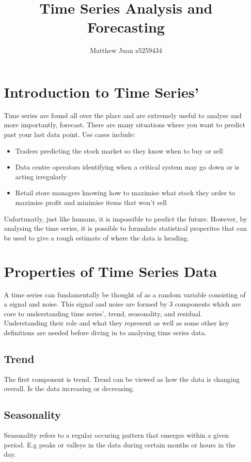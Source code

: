 \documentclass{article}
\title{Time Series Analysis and Forecasting}
\author{Matthew Juan z5259434}
\date{}
\begin{document}
  \maketitle
  \newpage
  \doublespacing
  \tableofcontents
  \singlespacing
  \newpage
  \section{Introduction to Time Series'}
  Time series are found all over the place and are extremely useful
  to analyse and more importantly, forecast. There are many situations where
  you want to predict past your last data point.
  Use cases include:
  \begin{itemize}
    \item Traders predicting the stock market so they know when to buy or sell
    \item Data centre operators identifying when a critical system may go down or is acting irregularly
    \item Retail store managers knowing how to maximise what stock they order to maximise profit and minimise items that won't sell
  \end{itemize}
  Unfortunatly, just like humans, it is impossible to predict the future.
  However, by analysing the time series, it is possible to formulate
  statistical properites that can be used to give a rough estimate of
  where the data is heading.
  \newpage
  \section{Properties of Time Series Data}
  A time series can fundamentally be thought of as a random variable consisting of a signal and noise. This signal and noise are formed by 3 components which are core to understanding time series', trend, seasonality, and residual. Understanding their role and what they represent as well as some other key definitions are needed before diving in to analysing time series data.
  
  \subsection{Trend}
  The first component is trend. Trend can be viewed as how the data is changing overall. Is the data increasing or decreasing.
  
  \subsection{Seasonality}
  Seasonality refers to a regular occuring pattern that emerges within a given period. E.g peaks or valleys in the data during certain months or hours in the day.
  
\end{document}
